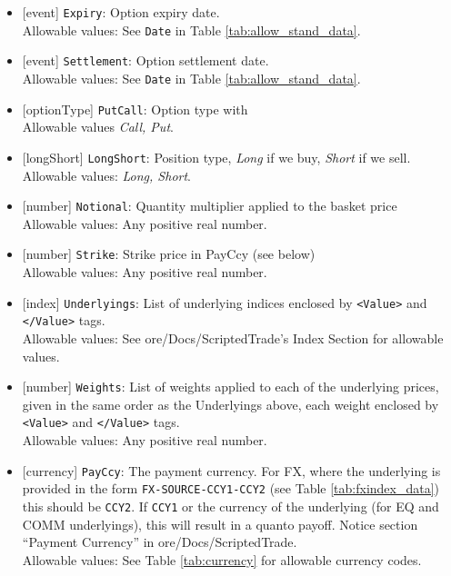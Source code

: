 \begin{itemize}
    \item{}[event] \lstinline!Expiry!: Option expiry date. \\
    Allowable values: See \lstinline!Date! in Table \ref{tab:allow_stand_data}.
    \item{}[event] \lstinline!Settlement!: Option settlement date. \\
    Allowable values: See \lstinline!Date! in Table \ref{tab:allow_stand_data}.
    \item{}[optionType] \lstinline!PutCall!: Option type with \\
          Allowable values \emph{Call, Put}.
    \item{}[longShort] \lstinline!LongShort!: Position type,
          {\em Long} if we buy, {\em Short} if we sell.\\
    Allowable values: \emph{Long, Short}.
        \item{}[number] \lstinline!Notional!: Quantity multiplier applied to the
          basket price \\
          Allowable values: Any positive real number.
        \item{}[number] \lstinline!Strike!: Strike price in PayCcy (see
          below) \\
          Allowable values: Any positive real number.
    \item{}[index] \lstinline!Underlyings!: List of underlying indices
          enclosed by {\tt <Value>} and {\tt </Value>} tags. \\
          Allowable values: See ore/Docs/ScriptedTrade's Index Section for allowable values.
    \item{}[number] \lstinline!Weights!: List of weights applied to each of
          the underlying prices, given in the same order as
          the Underlyings above, each weight enclosed by {\tt <Value>} and {\tt </Value>} tags.\\
          Allowable values: Any positive real number.
      \item{}[currency] \lstinline!PayCcy!: The payment currency. For FX, where the underlying is provided
      in the form \lstinline!FX-SOURCE-CCY1-CCY2! (see Table \ref{tab:fxindex_data}) this should
      be \lstinline!CCY2!. If \lstinline!CCY1! or the currency of the underlying (for EQ and
      COMM underlyings), this will result in a quanto payoff. Notice section ``Payment Currency'' in ore/Docs/ScriptedTrade. \\
        Allowable values: See Table \ref{tab:currency} for allowable currency codes.
\end{itemize}

